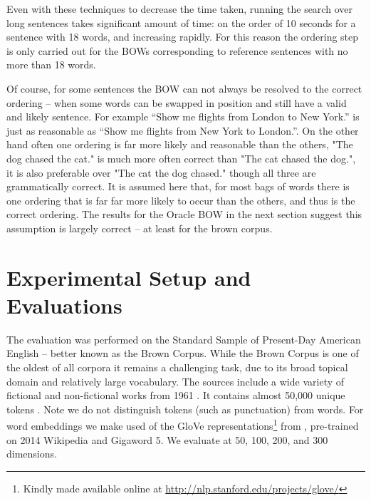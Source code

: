 \documentclass[11pt]{article}
\theoremstyle{plain}
\theoremstyle{definition}
\begin{document}
Even with these techniques to decrease the time taken, running the search over long sentences takes significant amount of time: on the order of 10 seconds for a sentence with 18 words, and increasing rapidly. For this reason the ordering step is only carried out for the BOWs corresponding to reference sentences with no more than 18 words.
 
  
Of course, for some sentences the BOW can not always be resolved to the correct ordering -- when some words can be swapped in position and still have a valid and likely sentence. For example ``Show me flights from London to New York.'' is just as reasonable as  ``Show me flights from New York to London.''. On the other hand often one ordering is far more likely and reasonable than the others, "The dog chased the cat." is much more often correct than "The cat chased the dog.", it is also preferable over "The cat the dog chased." though all three are grammatically correct. It is assumed here that, for most bags of words there is one ordering that is far far more likely to occur than the others, and thus is the correct ordering. The results for the Oracle BOW in the next section suggest this assumption is largely correct -- at least for the brown corpus.

  



\section{Experimental Setup and Evaluations} \label{evalsettings}

The evaluation was performed on the  Standard Sample of Present-Day American English -- better known as the Brown Corpus. While the Brown Corpus is one of the oldest of all corpora it remains a challenging task, due to its broad topical domain and relatively large vocabulary. The sources include a wide variety of fictional and non-fictional works from 1961 \parencite{francis1979brown}. It contains almost 50,000 unique tokens . Note we do not distinguish tokens (such as punctuation) from words. For word embeddings we make used of the GloVe representations\footnote{Kindly made available online at \url{http://nlp.stanford.edu/projects/glove/}} from \textcite{pennington2014glove}, pre-trained on 2014 Wikipedia and Gigaword 5. We evaluate at 50, 100, 200, and 300 dimensions.
\end{document}
